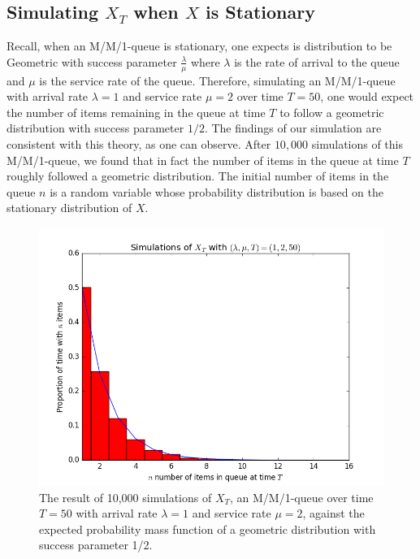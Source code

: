 \documentclass[11pt, oneside]{article}
\begin{document}
\subsection{Simulating $X_T$ when $X$ is Stationary}
Recall, when an M/M/1-queue is stationary, one expects is distribution to be Geometric with success parameter $\frac{\lambda}{\mu}$ where $\lambda$ is the rate of arrival to the queue and $\mu$ is the service rate of the queue. Therefore, simulating an M/M/1-queue with arrival rate $\lambda=1$ and service rate $\mu=2$ over time $T=50$, one would expect the number of items remaining in the queue at time $T$ to follow a geometric distribution with success parameter $1/2$. The findings of our simulation are consistent with this theory, as one can observe. After $10,000$ simulations of this M/M/1-queue, we found that in fact the number of items in the queue at time $T$ roughly followed a geometric distribution. The initial number of items in the queue $n$ is a random variable whose probability distribution is based on the stationary distribution of $X$.
\begin{figure}[H]
\includegraphics[scale=0.6]{simulation_xt}
\caption{The result of 10,000 simulations of $X_T$, an M/M/1-queue over time $T=50$ with arrival rate $\lambda=1$ and service rate $\mu=2$, against the expected probability mass function of a geometric distribution with success parameter 1/2.}
\label{fig:x}
\end{figure}
\end{document}
